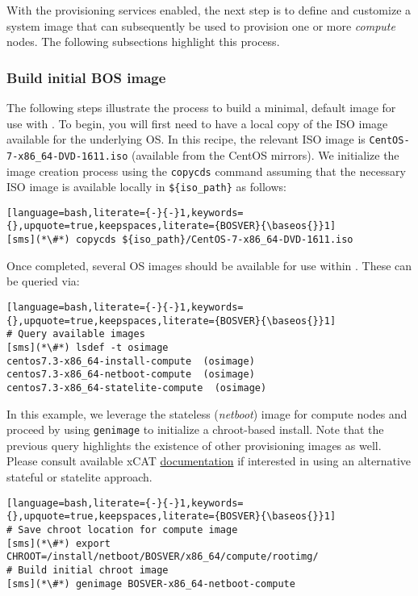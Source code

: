 
With the provisioning services enabled, the next step is to define and customize a system image that can subsequently be
used to provision one or more {\em compute} nodes. The following subsections highlight this process.

\subsubsection{Build initial BOS image} \label{sec:assemble_bos}
The following steps illustrate the process to build a minimal, default image for use with \xCAT{}. To begin, you will
first need to have a local copy of the ISO image available for the underlying OS. In this recipe, the relevant ISO image
is \texttt{CentOS-7-x86\_64-DVD-1611.iso} (available from the CentOS mirrors). We initialize the image
creation process using the \texttt{copycds} command assuming that the necessary ISO image is available locally in 
\texttt{\$\{iso\_path\}} as follows:

\begin{lstlisting}[language=bash,literate={-}{-}1,keywords={},upquote=true,keepspaces,literate={BOSVER}{\baseos{}}1]
[sms](*\#*) copycds ${iso_path}/CentOS-7-x86_64-DVD-1611.iso
\end{lstlisting}

\noindent Once completed, several OS images should be available for use within \xCAT{}. These can be queried via:

\begin{lstlisting}[language=bash,literate={-}{-}1,keywords={},upquote=true,keepspaces,literate={BOSVER}{\baseos{}}1]
# Query available images
[sms](*\#*) lsdef -t osimage
centos7.3-x86_64-install-compute  (osimage)
centos7.3-x86_64-netboot-compute  (osimage)
centos7.3-x86_64-statelite-compute  (osimage)
\end{lstlisting}


In this example, we leverage the stateless ({\em netboot}) image for compute nodes and proceed by using
\texttt{genimage} to initialize a chroot-based install. Note that the previous query highlights the existence of other
provisioning images as well. Please consult available xCAT
\href{https://xcat-docs.readthedocs.io/en/stable/}{\color{blue} documentation} if interested in using an alternative
stateful or statelite approach.
\newpage

\begin{lstlisting}[language=bash,literate={-}{-}1,keywords={},upquote=true,keepspaces,literate={BOSVER}{\baseos{}}1]
# Save chroot location for compute image
[sms](*\#*) export CHROOT=/install/netboot/BOSVER/x86_64/compute/rootimg/
# Build initial chroot image
[sms](*\#*) genimage BOSVER-x86_64-netboot-compute
\end{lstlisting}
